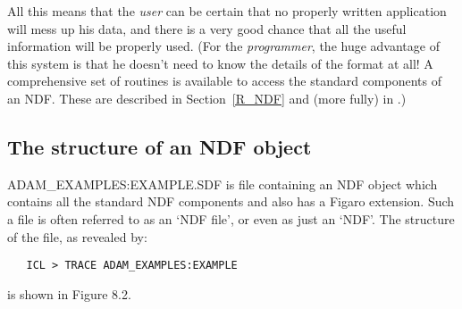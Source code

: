 All this means that the {\em user} can be certain that no properly written
application will mess up his data, and there is a very good chance
that all the useful information will be properly used.
(For the {\em programmer}, the huge advantage of this system is that he
doesn't need to know the details of the format at all!
A comprehensive set of routines is available to access the standard components
of an NDF.
These are described in Section~\ref{R_NDF} and (more fully) in
.)

\subsection{The structure of an NDF object}
\label{S_ndfstruc}

ADAM\_EXAMPLES:EXAMPLE.SDF is file containing an NDF object which contains all
the standard NDF components and also has a Figaro extension.
Such a file is often referred to as an `NDF file', or even as just an `NDF'.
The structure of the file, as revealed by:

\begin{small}
\begin{verbatim}
   ICL > TRACE ADAM_EXAMPLES:EXAMPLE
\end{verbatim}
\end{small}

is shown in Figure 8.2.

